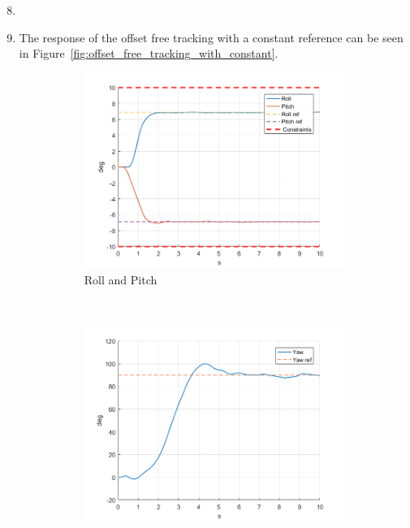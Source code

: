 \documentclass[11pt]{article}
\begin{document}
\begin{enumerate}
    \setcounter{enumi}{7}
    \item
	\item The response of the offset free tracking with a constant reference can be
    seen in Figure~\ref{fig:offset_free_tracking_with_constant}.
    \begin{figure}[ht]
        \centering
        \begin{subfigure}[c]{0.3\linewidth}
            \centering
            \includegraphics[width=\linewidth]{Plots_09_OffsetFreeTracking_Constant/01}
            \caption{Roll and Pitch}
        \end{subfigure}
        ~
        \begin{subfigure}[c]{0.3\linewidth}
            \centering
            \includegraphics[width=\linewidth]{Plots_09_OffsetFreeTracking_Constant/02}

\end{subfigure}
\end{figure}
\end{enumerate}
\end{document}
